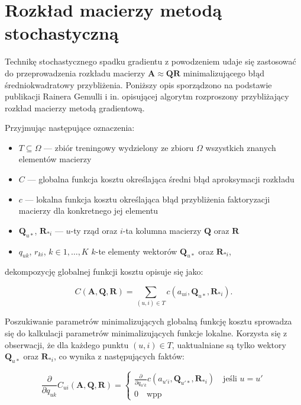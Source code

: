 \documentclass{pracamgr}
\begin{document}
\section{Rozkład macierzy metodą stochastyczną}
Technikę stochastycznego spadku gradientu z powodzeniem udaje się zastosować do przeprowadzenia rozkładu macierzy $\mathbf{A} \approx \mathbf{Q} \mathbf{R}$ minimalizującego błąd średniokwadratowy przybliżenia. Poniższy opis sporządzono na podstawie publikacji Rainera Gemulli i in. \cite{gemulla} opisującej algorytm rozproszony przybliżający rozkład macierzy metodą gradientową. 

Przyjmując następujące oznaczenia:
\begin{itemize} %
    \item $T \subseteq \Omega$ --- zbiór treningowy wydzielony ze zbioru $\Omega$ wszystkich znanych elementów macierzy 
    \item $C$ --- globalna funkcja kosztu określająca średni błąd aproksymacji rozkładu
    \item $c$ --- lokalna funkcja kosztu określająca błąd przybliżenia faktoryzacji macierzy dla konkretnego jej elementu
    \item $\mathbf{Q}_{u \ast}$, $\mathbf{R}_{\ast i}$ --- $u$-ty rząd oraz $i$-ta kolumna macierzy $\mathbf{Q}$ oraz $\mathbf{R}$
    \item $q_{uk}$, $r_{ki}$, $k \in {1, \ldots, K}$ $k$-te elementy wektorów $\mathbf{Q}_{u \ast}$ oraz $\mathbf{R}_{\ast i}$,  
\end{itemize}

dekompozycję globalnej funkcji kosztu opisuje się jako:

\[
C(\mathbf{A}, \mathbf{Q}, \mathbf{R}) = \sum_{(u,i) \in T} c(a_{ui}, \mathbf{Q}_{u \ast}, \mathbf{R}_{\ast i}).
\]

Poszukiwanie parametrów minimalizujących globalną funkcję kosztu sprowadza się do kalkulacji parametrów minimalizujących funkcje lokalne. Korzysta się z obserwacji, że dla każdego punktu $(u, i) \in T$, uaktualniane są tylko wektory $\mathbf{Q}_{u \ast}$ oraz $\mathbf{R}_{\ast i}$, co wynika z następujących faktów:

\[
\frac{\partial}{\partial q_{uk}} C_{ui}(\mathbf{A}, \mathbf{Q}, \mathbf{R}) = \begin{cases}
    \frac{\partial}{\partial q_{u'k}} c(a_{u'i}, \mathbf{Q}_{u' \ast}, \mathbf{R}_{\ast i}) \quad \text{jeśli $u = u'$} \\
    0 \quad \text{wpp}
\end{cases}
\]
\end{document}
